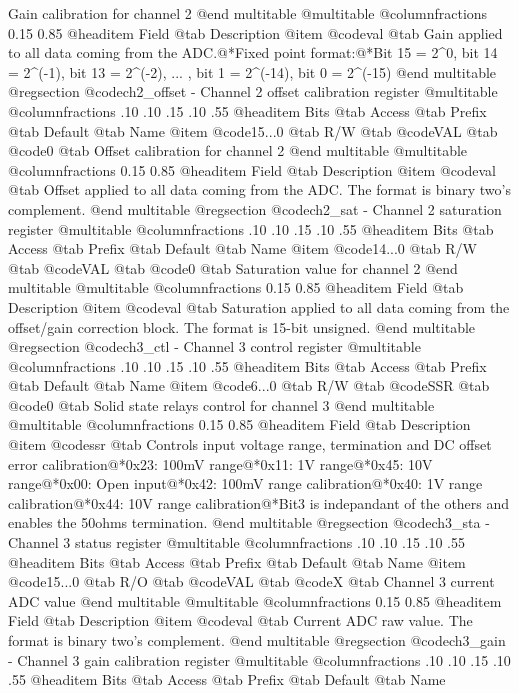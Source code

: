 Gain calibration for channel 2
@end multitable
@multitable @columnfractions 0.15 0.85
@headitem Field @tab Description
@item @code{val} @tab Gain applied to all data coming from the ADC.@*Fixed point format:@*Bit 15 = 2^0, bit 14 = 2^(-1), bit 13 = 2^(-2), ... , bit 1 = 2^(-14), bit 0 = 2^(-15)
@end multitable
@regsection @code{ch2_offset} - Channel 2 offset calibration register
@multitable @columnfractions .10 .10 .15 .10 .55
@headitem Bits @tab Access @tab Prefix @tab Default @tab Name
@item @code{15...0}
@tab R/W @tab
@code{VAL}
@tab @code{0} @tab 
Offset calibration for channel 2
@end multitable
@multitable @columnfractions 0.15 0.85
@headitem Field @tab Description
@item @code{val} @tab Offset applied to all data coming from the ADC. The format is binary two's complement.
@end multitable
@regsection @code{ch2_sat} - Channel 2 saturation register
@multitable @columnfractions .10 .10 .15 .10 .55
@headitem Bits @tab Access @tab Prefix @tab Default @tab Name
@item @code{14...0}
@tab R/W @tab
@code{VAL}
@tab @code{0} @tab 
Saturation value for channel 2
@end multitable
@multitable @columnfractions 0.15 0.85
@headitem Field @tab Description
@item @code{val} @tab Saturation applied to all data coming from the offset/gain correction block. The format is 15-bit unsigned.
@end multitable
@regsection @code{ch3_ctl} - Channel 3 control register
@multitable @columnfractions .10 .10 .15 .10 .55
@headitem Bits @tab Access @tab Prefix @tab Default @tab Name
@item @code{6...0}
@tab R/W @tab
@code{SSR}
@tab @code{0} @tab 
Solid state relays control for channel 3
@end multitable
@multitable @columnfractions 0.15 0.85
@headitem Field @tab Description
@item @code{ssr} @tab Controls input voltage range, termination and DC offset error calibration@*0x23: 100mV range@*0x11: 1V range@*0x45: 10V range@*0x00: Open input@*0x42: 100mV range calibration@*0x40: 1V range calibration@*0x44: 10V range calibration@*Bit3 is indepandant of the others and enables the 50ohms termination.
@end multitable
@regsection @code{ch3_sta} - Channel 3 status register
@multitable @columnfractions .10 .10 .15 .10 .55
@headitem Bits @tab Access @tab Prefix @tab Default @tab Name
@item @code{15...0}
@tab R/O @tab
@code{VAL}
@tab @code{X} @tab 
Channel 3 current ADC value
@end multitable
@multitable @columnfractions 0.15 0.85
@headitem Field @tab Description
@item @code{val} @tab Current ADC raw value. The format is binary two's complement.
@end multitable
@regsection @code{ch3_gain} - Channel 3 gain calibration register
@multitable @columnfractions .10 .10 .15 .10 .55
@headitem Bits @tab Access @tab Prefix @tab Default @tab Name
